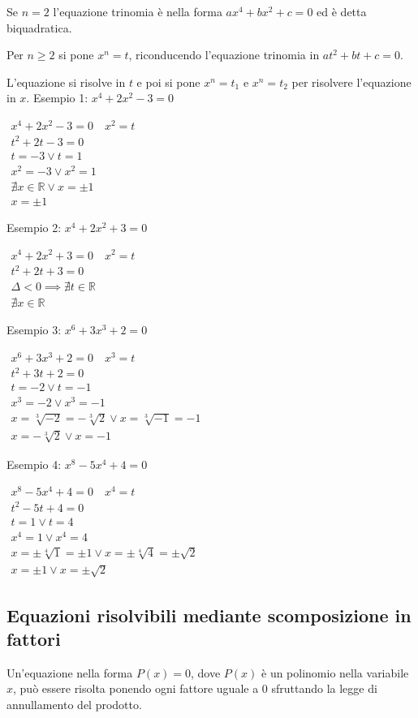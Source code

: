 \documentclass[a4paper]{article}
\theoremstyle{plain}
\theoremstyle{definition}
\theoremstyle{remark}
\newcommand{\R}{\mathbb{R}}
\begin{document}
Se $n=2$ l'equazione trinomia è nella forma $ax^4+bx^2+c=0$ ed è detta biquadratica.

Per $n\geq2$ si pone $x^n=t$, riconducendo l'equazione trinomia in $at^2+bt+c=0$.

L'equazione si risolve in $t$ e poi si pone $x^n=t_1$ e $x^n=t_2$ per risolvere l'equazione in $x$.
\newpage
Esempio 1: $x^4+2x^2-3=0$

$\begin{array}{l}
   x^4+2x^2-3=0\quad x^2=t\\
   t^2+2t-3=0\\
   t=-3\lor t=1\\
   x^2=-3\lor x^2=1\\
   \nexists x\in\R\lor x=\pm1\\
   x=\pm1
\end{array}$

Esempio 2: $x^4+2x^2+3=0$

$\begin{array}{l}
    x^4+2x^2+3=0\quad x^2=t\\
    t^2+2t+3=0\\
    \Delta<0\implies\nexists t\in\R\\
    \nexists x\in\R
\end{array}$

Esempio 3: $x^6+3x^3+2=0$

$\begin{array}{l}
    x^6+3x^3+2=0\quad x^3=t\\
    t^2+3t+2=0\\
    t=-2\lor t=-1\\
    x^3=-2\lor x^3=-1\\
    x=\sqrt[3]{-2}=-\sqrt[3]{2}\lor x=\sqrt[3]{-1}=-1\\
    x=-\sqrt[3]{2}\lor x=-1
\end{array}$

Esempio 4: $x^8-5x^4+4=0$

$\begin{array}{l}
   x^8-5x^4+4=0\quad x^4=t\\
   t^2-5t+4=0\\
   t=1\lor t=4\\
   x^4=1\lor x^4=4\\
   x=\pm\sqrt[4]{1}=\pm1\lor x=\pm\sqrt[4]{4}=\pm\sqrt{2}\\
   x=\pm1\lor x=\pm\sqrt{2}
\end{array}$
\newpage
\subsection{Equazioni risolvibili mediante scomposizione in fattori}
Un'equazione nella forma $P(x)=0$, dove $P(x)$ è un polinomio nella variabile $x$, può essere risolta ponendo ogni fattore uguale a $0$ sfruttando la legge di annullamento del prodotto.
\end{document}
